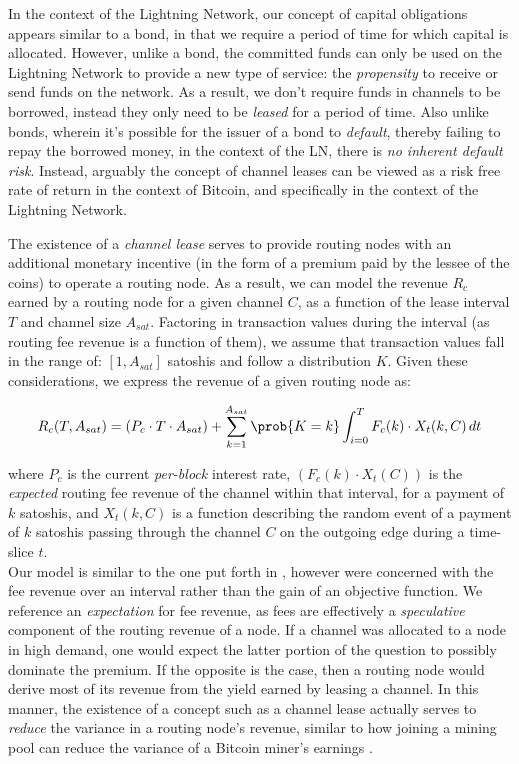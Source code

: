 \documentclass[10pt,a4paper]{article}
\theoremstyle{definition}
\begin{document}
In the context of the Lightning Network, our concept of capital obligations
appears similar to a bond, in that we require a period of time for which
capital is allocated. However, unlike a bond, the committed funds can only be
used on the Lightning Network to provide a new type of service: the
\emph{propensity} to receive or send funds on the network. As a result, we
don't require funds in channels to be borrowed, instead they only need to be
\emph{leased} for a period of time. Also unlike bonds, wherein it's possible
for the issuer of a bond to \emph{default}, thereby failing to repay the
borrowed money, in the context of the LN, there is \emph{no inherent default
risk}.  Instead, arguably the concept of channel leases can be viewed as a risk
free rate of return in the context of Bitcoin, and specifically in the context
of the Lightning Network.

The existence of a \emph{channel lease} serves to provide routing nodes with an
additional monetary incentive (in the form of a premium paid by the lessee of
the coins) to operate a routing node. As a result, we can model the revenue
$R_c$ earned by a routing node for a given channel $C$, as a function of the
lease interval $T$ and channel size $A_{sat}$. Factoring in transaction values
during the interval (as routing fee revenue is a function of them), we assume
that transaction values fall in the range of: $[1, A_{sat}]$ satoshis and
follow a distribution $K$. Given these considerations, we express the revenue
of a given routing node as:

\begin{equation}
    R_c(T, A_{sat}) = (P_c \cdot T \cdot A_{sat}) + \sum_{k=1}^{A_{sat}} \prob{K=k} \int_{i=0}^{T} F_c(k) \cdot X_{t}(k, C) \,dt 
\end{equation}

where $P_c$ is the current \emph{per-block} interest rate, $(F_c(k)\cdot
X_{t}(C))$ is the \emph{expected} routing fee revenue of the channel within
that interval, for a payment of $k$ satoshis, and $X_{t}(k, C)$ is a function
describing the random event of a payment of $k$ satoshis passing through the
channel $C$ on the outgoing edge during a time-slice $t$. \\

Our model is similar to the one put forth in \cite{payChanProfit}, however were
concerned with the fee revenue over an interval rather than the gain of an
objective function. We reference an \emph{expectation} for fee revenue, as fees
are effectively a \emph{speculative} component of the routing revenue of a
node. If a channel was allocated to a node in high demand, one would expect the
latter portion of the question to possibly dominate the premium. If the
opposite is the case, then a routing node would derive most of its revenue from
the yield earned by leasing a channel. In this manner, the existence of a
concept such as a channel lease actually serves to \emph{reduce} the variance
in a routing node's revenue, similar to how joining a mining pool can reduce
the variance of a Bitcoin miner's earnings \cite{meniVariance}.
\end{document}
